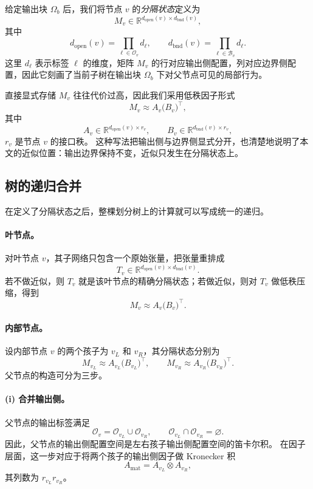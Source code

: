给定输出块 $\Omega_b$ 后，我们将节点 $v$ 的\emph{分隔状态}定义为
\[
M_v \in \mathbb{R}^{d_{\mathrm{open}}(v) \times d_{\mathrm{bnd}}(v)},
\]
其中
\[
d_{\mathrm{open}}(v)=\prod_{\ell\in\mathcal O_v} d_{\ell},
\qquad
d_{\mathrm{bnd}}(v)=\prod_{\ell\in\mathcal B_v} d_{\ell}.
\]
这里 $d_{\ell}$ 表示标签 $\ell$ 的维度，矩阵 $M_v$ 的行对应输出侧配置，列对应边界侧配置，因此它刻画了当前子树在输出块 $\Omega_b$ 下对父节点可见的局部行为。

直接显式存储 $M_v$ 往往代价过高，因此我们采用低秩因子形式
\[
M_v \approx A_v \bigl(B_v\bigr)^\top,
\]
其中
\[
A_v \in \mathbb{R}^{d_{\mathrm{open}}(v) \times r_v},
\qquad
B_v \in \mathbb{R}^{d_{\mathrm{bnd}}(v) \times r_v},
\]
$r_v$ 是节点 $v$ 的接口秩。
这种写法把输出侧与边界侧显式分开，也清楚地说明了本文的近似位置：输出边界保持不变，近似只发生在分隔状态上。

\subsection{树的递归合并}
在定义了分隔状态之后，整棵划分树上的计算就可以写成统一的递归。

\paragraph{叶节点。}
对叶节点 $v$，其子网络只包含一个原始张量，把张量重排成
\[
T_v \in \mathbb{R}^{d_{\mathrm{open}}(v) \times d_{\mathrm{bnd}}(v)}.
\]
若不做近似，则 $T_v$ 就是该叶节点的精确分隔状态；若做近似，则对 $T_v$ 做低秩压缩，得到
\[
M_v \approx A_v \bigl(B_v\bigr)^\top.
\]

\paragraph{内部节点。}
设内部节点 $v$ 的两个孩子为 $v_L$ 和 $v_R$，其分隔状态分别为
\[
M_{v_L} \approx A_{v_L} \bigl(B_{v_L}\bigr)^\top,
\qquad
M_{v_R} \approx A_{v_R} \bigl(B_{v_R}\bigr)^\top.
\]
父节点的构造可分为三步。

\paragraph{(i) 合并输出侧。}
父节点的输出标签满足
\[
\mathcal O_v = \mathcal O_{v_L} \cup \mathcal O_{v_R},
\qquad
\mathcal O_{v_L} \cap \mathcal O_{v_R} = \varnothing.
\]
因此，父节点的输出侧配置空间是左右孩子输出侧配置空间的笛卡尔积。
在因子层面，这一步对应于将两个孩子的输出侧因子做 Kronecker 积
\[
A_{\mathrm{mat}} = A_{v_L} \otimes A_{v_R},
\]
其列数为 $r_{v_L} r_{v_R}$。

